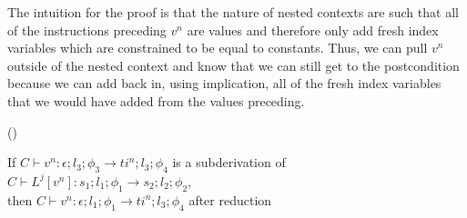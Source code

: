 The intuition for the proof is that the nature of nested contexts are such that all of the instructions preceding $v^n$ are values and therefore only add fresh index variables which are constrained to be equal to constants.
Thus, we can pull $v^n$ outside of the nested context and know that we can still get to the postcondition because we can add back in, using implication, all of the fresh index variables that we would have added from the values preceding.

\begin{lemma}{()}

    If $C \vdash v^n : \epsilon;l_3;\phi_3 \rightarrow ti^n;l_3;\phi_4$ is a subderivation of $C \vdash  L^j [v^n] : s_1;l_1;\phi_1 \rightarrow s_2;l_2;\phi_2$,
    \\then $C \vdash v^n : \epsilon;l_1;\phi_1 \rightarrow ti^n;l_3;\phi_4$ after reduction
\end{lemma}
